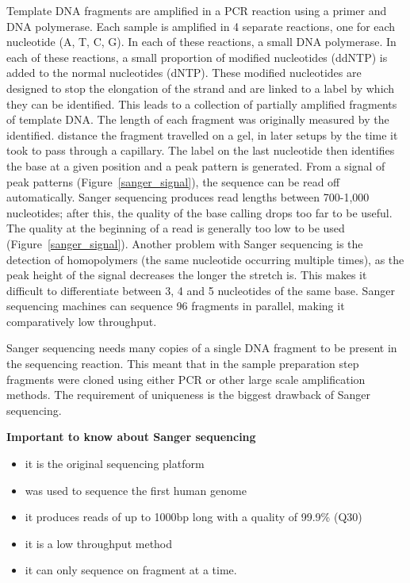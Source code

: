 \begin{framed}
Template DNA fragments are amplified in a PCR reaction using a primer and
DNA polymerase. Each sample is amplified in 4 separate reactions, one for
each nucleotide (A, T, C, G). In each of these reactions, a small
DNA polymerase. In each of these reactions, a small
proportion of modified nucleotides (ddNTP) is added to the normal
nucleotides (dNTP). These modified nucleotides are designed to stop the
elongation of the strand and are linked to a label by which they can be
identified. This leads to a collection of partially amplified fragments of
template DNA. The length of each fragment was originally measured by the
identified. distance the fragment travelled on a gel, in later setups by the time it
took to pass through a capillary.  The label on the last nucleotide then
identifies the base at a given position and a peak pattern is generated.
From a signal of peak patterns (Figure~\ref{sanger_signal}), the sequence can be read
off automatically. Sanger sequencing produces read lengths between
700-1,000 nucleotides; after this, the quality of the base calling drops too
far to be useful. The quality at the beginning of a read is generally too
low to be used (Figure~\ref{sanger_signal}). Another problem with Sanger sequencing is
the detection of homopolymers (the same nucleotide occurring multiple
times), as the peak height of the signal decreases the longer the stretch
is. This makes it difficult to differentiate between 3, 4 and 5 nucleotides
of the same base. Sanger sequencing machines can sequence 96 fragments in
parallel, making it comparatively low throughput.
\end{framed}

Sanger sequencing needs many copies of a single DNA fragment to be present in
the sequencing reaction. This meant that in the sample preparation step
fragments were cloned using either PCR or other large scale amplification methods.
The requirement of uniqueness is the biggest drawback of Sanger sequencing.

\begin{framed}
\textbf{Important to know about Sanger sequencing}\\
\begin{itemize}
\item it is the original sequencing platform
\item was used to sequence the first human genome
\item it produces reads of up to 1000bp long with a quality of 99.9\% (Q30)
\item it is a low throughput method
\item it can only sequence on fragment at a time.
\end{itemize}
\end{framed}

